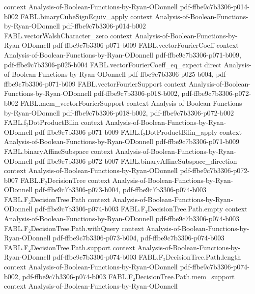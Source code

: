 \begin{theorem}
  {context}
  {Analysis-of-Boolean-Functions-by-Ryan-ODonnell}
  {pdf-ffbe9c7b3306-p014-b002}
\proofstep
  {FABL.binaryCubeSignEquiv_apply}
  {context}
  {Analysis-of-Boolean-Functions-by-Ryan-ODonnell}
  {pdf-ffbe9c7b3306-p014-b002}
\proofstep
  {FABL.vectorWalshCharacter_zero}
  {context}
  {Analysis-of-Boolean-Functions-by-Ryan-ODonnell}
  {pdf-ffbe9c7b3306-p071-b009}
\proofstep
  {FABL.vectorFourierCoeff}
  {context}
  {Analysis-of-Boolean-Functions-by-Ryan-ODonnell}
  {pdf-ffbe9c7b3306-p071-b009,
    pdf-ffbe9c7b3306-p025-b004}
\proofstep
  {FABL.vectorFourierCoeff_eq_expect}
  {direct}
  {Analysis-of-Boolean-Functions-by-Ryan-ODonnell}
  {pdf-ffbe9c7b3306-p025-b004,
    pdf-ffbe9c7b3306-p071-b009}
\proofstep
  {FABL.vectorFourierSupport}
  {context}
  {Analysis-of-Boolean-Functions-by-Ryan-ODonnell}
  {pdf-ffbe9c7b3306-p018-b002,
    pdf-ffbe9c7b3306-p072-b002}
\proofstep
  {FABL.mem_vectorFourierSupport}
  {context}
  {Analysis-of-Boolean-Functions-by-Ryan-ODonnell}
  {pdf-ffbe9c7b3306-p018-b002,
    pdf-ffbe9c7b3306-p072-b002}
\proofstep
  {FABL.f₂DotProductBilin}
  {context}
  {Analysis-of-Boolean-Functions-by-Ryan-ODonnell}
  {pdf-ffbe9c7b3306-p071-b009}
\proofstep
  {FABL.f₂DotProductBilin_apply}
  {context}
  {Analysis-of-Boolean-Functions-by-Ryan-ODonnell}
  {pdf-ffbe9c7b3306-p071-b009}
\proofstep
  {FABL.binaryAffineSubspace}
  {context}
  {Analysis-of-Boolean-Functions-by-Ryan-ODonnell}
  {pdf-ffbe9c7b3306-p072-b007}
\proofstep
  {FABL.binaryAffineSubspace_direction}
  {context}
  {Analysis-of-Boolean-Functions-by-Ryan-ODonnell}
  {pdf-ffbe9c7b3306-p072-b007}
\proofstep
  {FABL.F₂DecisionTree}
  {context}
  {Analysis-of-Boolean-Functions-by-Ryan-ODonnell}
  {pdf-ffbe9c7b3306-p073-b004,
    pdf-ffbe9c7b3306-p074-b003}
\proofstep
  {FABL.F₂DecisionTree.Path}
  {context}
  {Analysis-of-Boolean-Functions-by-Ryan-ODonnell}
  {pdf-ffbe9c7b3306-p074-b003}
\proofstep
  {FABL.F₂DecisionTree.Path.empty}
  {context}
  {Analysis-of-Boolean-Functions-by-Ryan-ODonnell}
  {pdf-ffbe9c7b3306-p074-b003}
\proofstep
  {FABL.F₂DecisionTree.Path.withQuery}
  {context}
  {Analysis-of-Boolean-Functions-by-Ryan-ODonnell}
  {pdf-ffbe9c7b3306-p073-b004,
    pdf-ffbe9c7b3306-p074-b003}
\proofstep
  {FABL.F₂DecisionTree.Path.support}
  {context}
  {Analysis-of-Boolean-Functions-by-Ryan-ODonnell}
  {pdf-ffbe9c7b3306-p074-b003}
\proofstep
  {FABL.F₂DecisionTree.Path.length}
  {context}
  {Analysis-of-Boolean-Functions-by-Ryan-ODonnell}
  {pdf-ffbe9c7b3306-p074-b002,
    pdf-ffbe9c7b3306-p074-b003}
\proofstep
  {FABL.F₂DecisionTree.Path.mem_support}
  {context}
  {Analysis-of-Boolean-Functions-by-Ryan-ODonnell}

\end{theorem}
